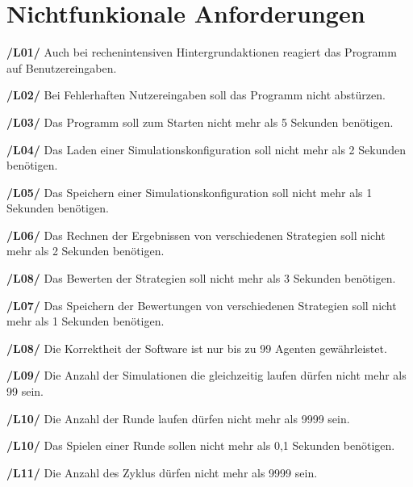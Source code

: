 \section{Nichtfunkionale Anforderungen}

\textbf{/L01/ }
Auch bei rechenintensiven Hintergrundaktionen reagiert das Programm auf Benutzereingaben.

\textbf{/L02/}
Bei Fehlerhaften Nutzereingaben soll das Programm nicht abstürzen.

\textbf{/L03/}
Das Programm soll zum Starten nicht mehr als 5 Sekunden benötigen.

\textbf{/L04/}
Das Laden einer Simulationskonfiguration soll nicht mehr als 2 Sekunden benötigen.

\textbf{/L05/}
Das Speichern einer Simulationskonfiguration soll nicht mehr als 1 Sekunden benötigen.

\textbf{/L06/}
Das Rechnen der Ergebnissen von verschiedenen Strategien soll nicht mehr als 2 Sekunden benötigen.

\textbf{/L08/}
Das Bewerten der Strategien soll nicht mehr als 3 Sekunden benötigen.

\textbf{/L07/}
Das Speichern der Bewertungen von verschiedenen Strategien soll nicht mehr als 1 Sekunden benötigen.

\textbf{/L08/}
Die Korrektheit der Software ist nur bis zu 99 Agenten gewährleistet.

\textbf{/L09/}
Die Anzahl der Simulationen die gleichzeitig laufen dürfen nicht mehr als 99 sein.

\textbf{/L10/}
Die Anzahl der Runde laufen dürfen nicht mehr als 9999 sein.

\textbf{/L10/}
Das Spielen einer Runde sollen nicht mehr als 0,1 Sekunden benötigen.

\textbf{/L11/}
Die Anzahl des Zyklus dürfen nicht mehr als 9999 sein.


